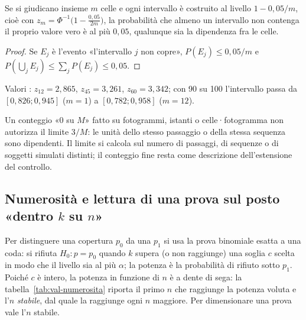 \begin{proposizione}\label{prop:val-celle}
Se si giudicano insieme $m$ celle e ogni intervallo è costruito al livello $1-0{,}05/m$, cioè con $z_m=\Phi^{-1}\bigl(1-\tfrac{0{,}05}{2m}\bigr)$, la probabilità che almeno un intervallo non contenga il proprio valore vero è al più $0{,}05$, qualunque sia la dipendenza fra le celle. 
\end{proposizione}
\begin{proof}
Se $E_j$ è l'evento «l'intervallo $j$ non copre», $P(E_j)\le0{,}05/m$ e $P(\bigcup_jE_j)\le\sum_jP(E_j)\le0{,}05$.
\end{proof}
Valori : $z_{12}=2{,}865$, $z_{45}=3{,}261$, $z_{60}=3{,}342$; con 90 su 100 l'intervallo passa da $[0{,}826;0{,}945]$ ($m=1$) a $[0{,}782;0{,}958]$ ($m=12$).

\begin{osservazione}\label{oss:val-unita}
Un conteggio «0 su $M$» fatto su fotogrammi, istanti o celle·fotogramma non autorizza il limite $3/M$: le unità dello stesso passaggio o della stessa sequenza sono dipendenti. Il limite si calcola sul numero di passaggi, di sequenze o di soggetti simulati distinti; il conteggio fine resta come descrizione dell'estensione del controllo.
\end{osservazione}

\subsection{Numerosità e lettura di una prova sul posto «dentro $k$ su $n$»}\label{sec:val-numerosita}

Per distinguere una copertura $p_0$ da una $p_1$ si usa la prova binomiale esatta a una coda: si rifiuta $H_0\colon p=p_0$ quando $k$ supera (o non raggiunge) una soglia $c$ scelta in modo che il livello sia al più $\alpha$; la potenza è la probabilità di rifiuto sotto $p_1$. Poiché $c$ è intero, la potenza in funzione di $n$ è a dente di sega: la tabella~\ref{tab:val-numerosita} riporta il primo $n$ che raggiunge la potenza voluta e l'$n$ \emph{stabile}, dal quale la raggiunge ogni $n$ maggiore. Per dimensionare una prova vale l'$n$ stabile.

